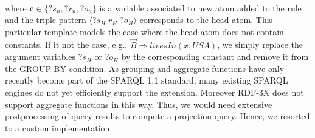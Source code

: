  \\
\noindent where $\bm{c} \in \{ ?s_n, ?r_n, ?o_n \}$ is a variable associated to new atom added to the rule
and the triple pattern $\langle ?s_H \; r_H \; ?o_H \rangle$ corresponds to the head atom. This particular template models the case
where the head atom does not contain constants. If it not the case, e.g., $\vec{B} \Rightarrow livesIn(x, USA)$, 
we simply replace the argument variables $?s_H$ or $?o_H$ by the corresponding constant and remove it from the GROUP BY condition.  
As grouping and aggregate functions have only recently become part of the SPARQL 1.1 standard, 
many existing SPARQL engines do not yet efficiently support the extension. Moreover 
RDF-3X does not support aggregate functions in this way. 
Thus, we would need extensive postprocessing of query results to compute a projection query.
Hence, we resorted to a custom implementation.

